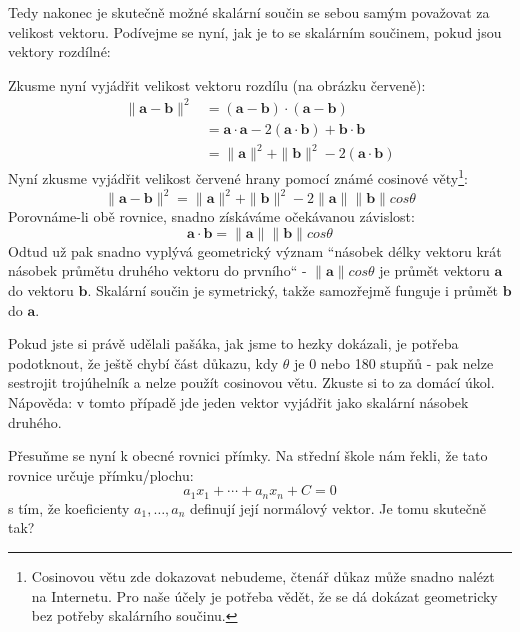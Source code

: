 \documentclass[a5paper,12pt]{amsbook}
\theoremstyle{definition}
\newcommand{\myvec}[1]{\bm{#1}}
\begin{document}
Tedy nakonec je skutečně možné skalární součin se sebou samým považovat za velikost vektoru. Podívejme
se nyní, jak je to se skalárním součinem, pokud jsou vektory rozdílné:
\begin{center}

\end{center}
Zkusme nyní vyjádřit velikost vektoru rozdílu (na obrázku červeně):
\begin{equation*}
\begin{split}
\|\myvec{a}-\myvec{b}\|^2 &= (\myvec{a}-\myvec{b})\cdot(\myvec{a}-\myvec{b}) \\
  &= \myvec{a}\cdot\myvec{a} - 2(\myvec{a}\cdot\myvec{b}) + \myvec{b}\cdot\myvec{b} \\
  &= \|\myvec{a}\|^2 + \|\myvec{b}\|^2 - 2(\myvec{a}\cdot\myvec{b})
\end{split}
\end{equation*}
Nyní zkusme vyjádřit velikost červené hrany pomocí známé cosinové věty\footnote{
  Cosinovou větu zde dokazovat nebudeme, čtenář důkaz může snadno nalézt na Internetu. Pro naše účely
  je potřeba vědět, že se dá dokázat geometricky bez potřeby skalárního součinu.
}:
\begin{equation*}
\|\myvec{a}-\myvec{b}\|^2 = \|\myvec{a}\|^2 + \|\myvec{b}\|^2 - 2\|\myvec{a}\|\|\myvec{b}\|cos\theta
\end{equation*}
Porovnáme-li obě rovnice, snadno získáváme očekávanou závislost:
\begin{equation*}
\myvec{a}\cdot\myvec{b} = \|\myvec{a}\|\|\myvec{b}\|cos\theta
\end{equation*}
Odtud už pak snadno vyplývá geometrický význam ``násobek délky vektoru krát násobek průmětu druhého
vektoru do prvního`` - $\|\myvec{a}\|cos\theta$ je průmět vektoru $\myvec{a}$ do vektoru $\myvec{b}$.
Skalární součin je symetrický, takže samozřejmě funguje i průmět $\myvec{b}$ do $\myvec{a}$.

Pokud jste si právě udělali pašáka, jak jsme to hezky dokázali, je potřeba podotknout, že ještě chybí
část důkazu, kdy $\theta$ je 0 nebo 180 stupňů - pak nelze sestrojit trojúhelník a nelze použít
cosinovou větu. Zkuste si to za domácí úkol. Nápověda: v tomto případě jde jeden vektor vyjádřit
jako skalární násobek druhého.

\medskip\noindent
Přesuňme se nyní k obecné rovnici přímky. Na střední škole nám řekli, že tato rovnice určuje
přímku/plochu:
\begin{equation*}
a_1x_1 + \cdots + a_nx_n + C = 0
\end{equation*}
s tím, že koeficienty $a_1, \ldots, a_n$ definují její normálový vektor. Je tomu skutečně tak?
\end{document}
